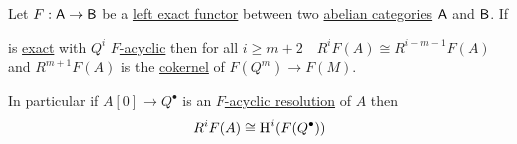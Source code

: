 \documentclass[../../../main]{subfiles}
\begin{document}
\begin{theorem} \label{thm:dimension-shifting}
  Let \(F: \mathsf{A} \to \mathsf{B}\) be a \hyperref[def:exact-complex-functor]{left exact functor} between two \hyperref[def:abelian-category]{abelian categories} \(\mathsf{A}\) and \(\mathsf{B}\).
  If
  \begin{center}
  \end{center}
  is \hyperref[def:short-exact-sequence]{exact} with \(Q^{i}\) \hyperref[def:acyclic-object]{\(F\)-acyclic} then for all \(i \geq m + 2 \quad R^{i}F(A) \cong R^{i-m-1}F(A)\) and \(R^{m+1}F(A)\) is the \hyperref[def:categorical-cokernel]{cokernel} of \(F(Q^{m}) \to F(M)\).

  In particular if \(A[0] \to Q^{\bullet}\) is an \hyperref[def:acyclic-object]{\(F\)-acyclic resolution} of \(A\) then
  \begin{align*}
    R^{i}F(A) \cong \operatorname{H}^{i}(F(Q^{\bullet}))
  \end{align*}
\end{theorem}
\end{document}
